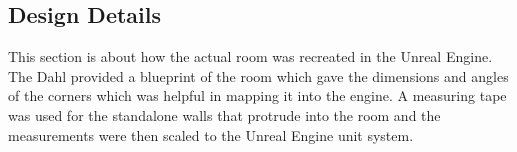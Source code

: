 

\subsection{Design Details}
This section is about how the actual room was recreated in the Unreal Engine.  The Dahl provided a blueprint of the room which gave the dimensions and angles of the corners which was helpful in mapping it into the engine.  A measuring tape was used for the standalone walls that protrude into the room and the measurements were then scaled to the Unreal Engine unit system.

